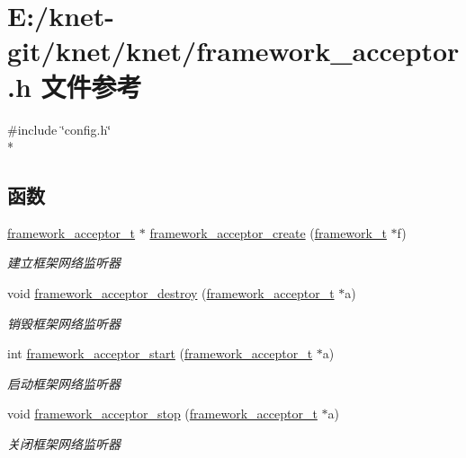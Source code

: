 \hypertarget{a00051}{}\section{E\+:/knet-\/git/knet/knet/framework\+\_\+acceptor.h 文件参考}
\label{a00051}
{\ttfamily \#include \char`\"{}config.\+h\char`\"{}}\\*
\subsection*{函数}
\begin{DoxyCompactItemize}
\item 
\hyperlink{a00047_ab0952db3c97c4760192720875e69d040_ab0952db3c97c4760192720875e69d040}{framework\+\_\+acceptor\+\_\+t} $\ast$ \hyperlink{a00051_a09f38093fc07ac67eb32a2d73d01ac00_a09f38093fc07ac67eb32a2d73d01ac00}{framework\+\_\+acceptor\+\_\+create} (\hyperlink{a00047_a6149d769f6f07ed14a40a271c95d8463_a6149d769f6f07ed14a40a271c95d8463}{framework\+\_\+t} $\ast$f)
\begin{DoxyCompactList}\small\item\em 建立框架网络监听器 \end{DoxyCompactList}\item 
void \hyperlink{a00051_a8547ef8ed59bf8fc10ce491cbc2e0e7d_a8547ef8ed59bf8fc10ce491cbc2e0e7d}{framework\+\_\+acceptor\+\_\+destroy} (\hyperlink{a00047_ab0952db3c97c4760192720875e69d040_ab0952db3c97c4760192720875e69d040}{framework\+\_\+acceptor\+\_\+t} $\ast$a)
\begin{DoxyCompactList}\small\item\em 销毁框架网络监听器 \end{DoxyCompactList}\item 
int \hyperlink{a00051_ae7af7233800a87f2719ba257be3fe738_ae7af7233800a87f2719ba257be3fe738}{framework\+\_\+acceptor\+\_\+start} (\hyperlink{a00047_ab0952db3c97c4760192720875e69d040_ab0952db3c97c4760192720875e69d040}{framework\+\_\+acceptor\+\_\+t} $\ast$a)
\begin{DoxyCompactList}\small\item\em 启动框架网络监听器 \end{DoxyCompactList}\item 
void \hyperlink{a00051_a53e38c44cdc8c84a57728a7f8e41dc27_a53e38c44cdc8c84a57728a7f8e41dc27}{framework\+\_\+acceptor\+\_\+stop} (\hyperlink{a00047_ab0952db3c97c4760192720875e69d040_ab0952db3c97c4760192720875e69d040}{framework\+\_\+acceptor\+\_\+t} $\ast$a)
\begin{DoxyCompactList}\small\item\em 关闭框架网络监听器 \end{DoxyCompactList}\end{DoxyCompactItemize}


